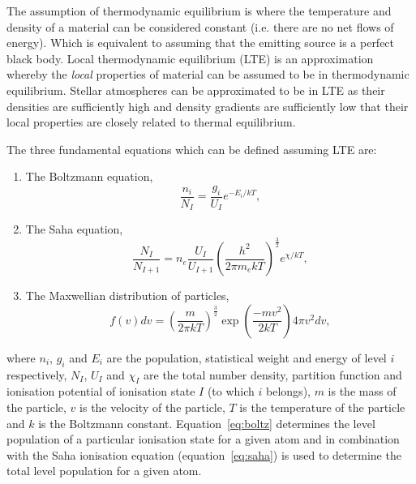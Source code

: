 The assumption of thermodynamic equilibrium is where the temperature and density of a material can be considered constant (i.e. there are no net flows of energy).
Which is equivalent to assuming that the emitting source is a perfect black body.
Local thermodynamic equilibrium (LTE) is an approximation whereby the {\it local} properties of material can be assumed to be in thermodynamic equilibrium.
Stellar atmospheres can be approximated to be in LTE as their densities are sufficiently high and density gradients are sufficiently low that their local properties are closely related to thermal equilibrium.

The three fundamental equations which can be defined assuming LTE are:

\begin{enumerate}
    \item The Boltzmann equation,
    \begin{equation}
        \frac{n_i}{N_I} = \frac{g_i}{U_I}e^{-E_i/kT},\label{eq:boltz}
    \end{equation}
    \item The Saha equation,
    \begin{equation}
        \frac{N_I}{N_{I+1}} = n_e\frac{U_I}{U_{I+1}}\left(\frac{h^2}{2\pi m_ekT}\right)^\frac{3}{2} e^{\chi/kT},
        \label{eq:saha}
    \end{equation}
    \item The Maxwellian distribution of particles,
    \begin{equation}
        f(v)dv = \left(\frac{m}{2\pi kT}\right)^\frac{3}{2} \exp\left(\frac{-mv^2}{2kT}\right)4\pi v^2dv,
        \label{eq:max}
    \end{equation}
\end{enumerate}

\noindent where $n_i$, $g_i$ and $E_i$ are the population, statistical weight and energy of level $i$ respectively,
$N_I$, $U_I$ and $\chi_I$ are the total number density, partition function and ionisation potential of ionisation state $I$ (to which $i$ belongs),
$m$ is the mass of the particle, $v$ is the velocity of the particle, $T$ is the temperature of the particle and $k$ is the Boltzmann constant.
Equation~\ref{eq:boltz} determines the level population of a particular ionisation state for a given atom and in combination with the Saha ionisation equation (equation~\ref{eq:saha}) is used to determine the total level population for a given atom.



